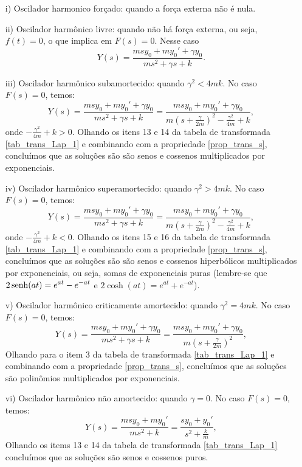 \documentclass[Main.tex]{subfiles}
\begin{document}
\begin{itemize}
 \item[i)] Oscilador harmonico forçado: quando a força externa não é nula.
 \item[ii)] Oscilador harmônico livre: quando não há força externa, ou seja, $f(t)=0$, o que implica em $F(s)=0$. Nesse caso
$$
Y(s)=\frac{msy_0+my_0'+\gamma y_0}{ms^2+\gamma s +k}.
$$
\item[iii)] Oscilador harmônico subamortecido: quando $\gamma^2< 4mk$. No caso $F(s)=0$, temos:
$$
Y(s)=\frac{msy_0+my_0'+\gamma y_0}{ms^2+\gamma s +k}=\frac{msy_0+my_0'+\gamma y_0}{m\left(s+\frac{\gamma}{2m}\right)^2-\frac{\gamma^2}{4m} +k},
$$
onde $-\frac{\gamma^2}{4m} +k>0$. Olhando os itens 13 e 14 da tabela de transformada \ref{tab_trans_Lap_1} e combinando com a propriedade \ref{prop_trans_s}, concluímos que as soluções são são senos e cossenos multiplicados por exponenciais.
\item[iv)] Oscilador harmônico superamortecido: quando $\gamma^2> 4mk$. No caso $F(s)=0$, temos:
$$
Y(s)=\frac{msy_0+my_0'+\gamma y_0}{ms^2+\gamma s +k}=\frac{msy_0+my_0'+\gamma y_0}{m\left(s+\frac{\gamma}{2m}\right)^2-\frac{\gamma^2}{4m} +k},
$$
onde $-\frac{\gamma^2}{4m} +k<0$. Olhando os itens 15 e 16 da tabela de transformada \ref{tab_trans_Lap_1} e combinando com a propriedade \ref{prop_trans_s}, concluímos que as soluções são são senos e cossenos hiperbólicos multiplicados por exponenciais, ou seja, somas de exponenciais puras (lembre-se que $\displaystyle 2\operatorname{senh}(at)=e^{at}-e^{-at}$ e $\displaystyle2\cosh(at)=e^{at}+e^{-at}$).
\item[v)] Oscilador harmônico criticamente amortecido: quando $\gamma^2= 4mk$. No caso $F(s)=0$, temos:
$$
Y(s)=\frac{msy_0+my_0'+\gamma y_0}{ms^2+\gamma s +k}=\frac{msy_0+my_0'+\gamma y_0}{m\left(s+\frac{\gamma}{2m}\right)^2},
$$
Olhando para o item 3 da tabela de transformada \ref{tab_trans_Lap_1} e combinando com a propriedade \ref{prop_trans_s}, concluímos que as soluções são polinômios multiplicados por exponenciais.
\item[vi)] Oscilador harmônico não amortecido: quando $\gamma= 0$. No caso $F(s)=0$, temos:
$$
Y(s)=\frac{msy_0+my_0'}{ms^2 +k}=\frac{sy_0+y_0'}{s^2+\frac{k}{m}},
$$
Olhando os items 13 e 14 da tabela de transformada \ref{tab_trans_Lap_1} concluímos que as soluções são senos e cossenos puros.

\end{itemize}
\end{document}
